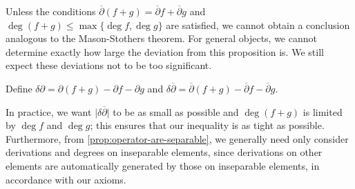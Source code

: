 Unless the conditions $\overline{\partial}(f + g) = \overline{\partial}f + \overline{\partial}g$ and $\deg(f + g) \le \max\{\deg f, \deg g\}$ are satisfied, we cannot obtain a conclusion analogous to the Mason-Stothers theorem. For general objects, we cannot determine exactly how large the deviation from this proposition is. We still expect these deviations not to be too significant.
\begin{definition}
	Define $\delta\partial = \partial(f + g) - \partial f - \partial g$ and $\delta\overline{\partial} = \overline{\partial}(f + g) - \overline{\partial}f - \overline{\partial}g$.
\end{definition}

In practice, we want $\vert\delta\overline{\partial}\vert$ to be as small as possible and $\deg(f + g)$ is limited by $\deg f$ and $\deg g$; this ensures that our inequality is as tight as possible. Furthermore, from \cref{prop:operator-are-separable}, we generally need only consider derivations and degrees on inseparable elements, since derivations on other elements are automatically generated by those on inseparable elements, in accordance with our axioms.
